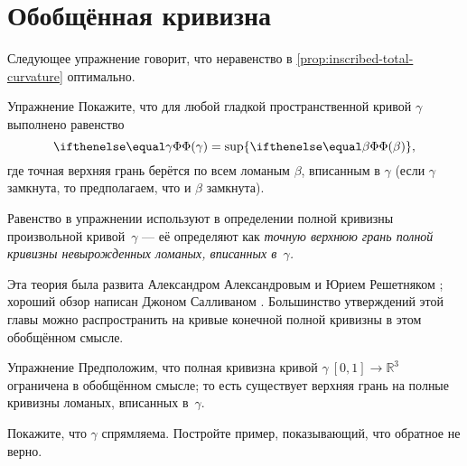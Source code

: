 \section{Обобщённая кривизна}

Следующее упражнение говорит, что неравенство в \ref{prop:inscribed-total-curvature} оптимально.

\begin{thm}{Упражнение}\label{ex:total-curvature=}
Покажите, что для любой гладкой пространственной кривой $\gamma$ выполнено равенство
\[\tc\gamma=\sup\{\tc\beta\},\]
где точная верхняя грань берётся по всем ломаным $\beta$, вписанным в $\gamma$
(если $\gamma$ замкнута, то предполагаем, что и $\beta$ замкнута).
\end{thm}

Равенство в упражнении используют в определении полной кривизны произвольной кривой~$\gamma$ --- её определяют как \textit{точную верхнюю грань полной кривизны невырожденных ломаных, вписанных в~$\gamma$.}

Эта теория была развита Александром Александровым и Юрием Решетняком \cite{aleksandrov-reshetnyak};
хороший обзор написан Джоном Салливаном \cite{sullivan-curves}.
Большинство утверждений этой главы можно распространить на кривые конечной полной кривизны в этом обобщённом смысле.

\begin{thm}{Упражнение}\label{ex:tc-rectifiable}
Предположим, что полная кривизна кривой $\gamma\:[0,1]\to\mathbb{R}^3$ ограничена в обобщённом смысле;
то есть существует верхняя грань на полные кривизны ломаных, вписанных в~$\gamma$.

Покажите, что $\gamma$ спрямляема.
Постройте пример, показывающий, что обратное не верно. 
\end{thm}
